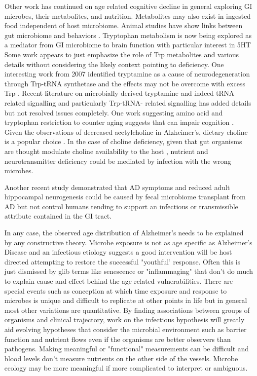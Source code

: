 \documentclass[aps,secnumarabic,balancelastpage,amsmath,amssymb,nofootinbib]{revtex4}
\begin{document}
Other work has continued on age related cognitive decline in general
exploring GI microbes, their metabolites, and nutrition. 
Metabolites may also exist in ingested food independent of host
microbiome. 
Animal studies have show links between gut microbiome
and behaviors \cite{PMID37717663}.
Tryptophan metabolism is now being explored as
a mediator from GI microbiome to brain function
\cite{PMC7231603} with particular interest in 5HT
\cite{PMID25078296}
Some work appears to just emphasize the role of Trp
metabolites and various details
\cite{Savonije_Weaver_Role_Tryptophan_2023}
without considering the likely context pointing to deficiency.
One interesting work from 2007 identified tryptamine
as a cause of neurodegeneration through Trp-tRNA synthetase 
and the effects may not be overcome with excess Trp
\cite{PMID17114825}. Recent literature on microbially derived
tryptamine and indeed tRNA related signalling and 
particularly Trp-tRNA- related signalling has added details but not
resolved issues completely. 
One work suggesting amino acid and tryptophan restriction
to counter aging suggests that can impair cognition
\cite{CANFIELD201970}.
Given the observations of decreased
acetylcholine in Alzheimer's, dietary choline is a popular choice
\cite{PMC7041773}. 
In the case of choline deficiency, given that gut organisms
are thought modulate choline availability to the host
\cite{MartinJBlaser_Intestinal_Microbiota_Composition_Modulates_2015}
, nutrient and neurotransmitter deficiency could be mediated by
infection with the wrong microbes.

Another recent study demonstrated that AD symptoms and reduced
adult hippocampal neurogenesis could be caused by
fecal microbiome transplant from AD but not control humans
\cite{10.1093/brain/awad303} tending to support
an infectious or transmissible attribute contained in the 
GI tract. 

In any case,  the observed age distribution of Alzheimer's
needs to be explained by any constructive theory.
Microbe exposure is not as  age specific
as Alzheimer's Disease and an infectious etiology 
 suggests a good intervention
will be host directed attempting to restore the successful
"youthful' response. 
Often this is just dismissed by glib terms like
senescence or "inflammaging" that don't do much
to explain cause and effect behind the age related
vulnerabilities.  
There are special events such as conception at which
time exposure and response to microbes is unique and difficult
to replicate at other points  in life but in general 
most other variations are quantitative.
By finding  associations between groups of organisms
and clinical trajectory, work on the infectious hypothesis
will greatly aid evolving hypotheses that consider the
microbial environment such as barrier function and nutrient flows 
even if the organisms are better observers than pathogens.
Making meaningful or "functional" measurements can be difficult
and blood levels don't measure nutrients on the other side
of the vessels. Microbe ecology may be more meaningful if
more complicated to interpret or ambiguous.  
\end{document}
